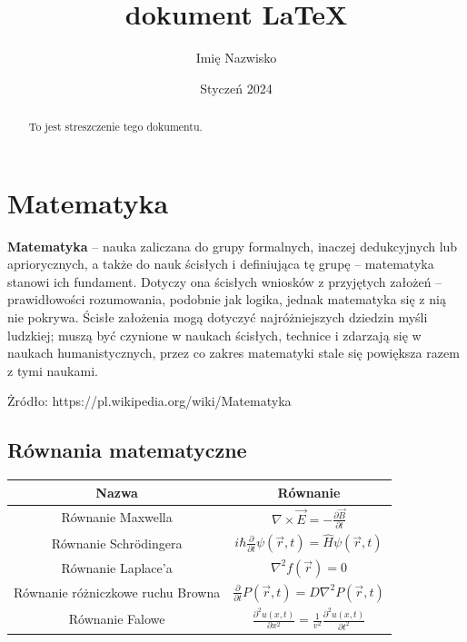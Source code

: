 \documentclass[]{article}
\title{dokument  \LaTeX}
\author{Imię Nazwisko}
\date{Styczeń 2024}
\begin{document}
\maketitle

\begin{abstract}
  To jest streszczenie tego dokumentu.
\end{abstract}

\tableofcontents

\newpage

\section{Matematyka}
\textbf{Matematyka } – nauka zaliczana do grupy formalnych, inaczej dedukcyjnych lub apriorycznych, a także do nauk ścisłych i definiująca tę grupę – matematyka stanowi ich fundament. Dotyczy ona ścisłych wniosków z przyjętych założeń – prawidłowości rozumowania, podobnie jak logika, jednak matematyka się z nią nie pokrywa. Ścisłe założenia mogą dotyczyć najróżniejszych dziedzin myśli ludzkiej; muszą być czynione w naukach ścisłych, technice i zdarzają się w naukach humanistycznych, przez co zakres matematyki stale się powiększa razem z tymi naukami. 
\begin{flushright}
\scriptsize
Żródło: https://pl.wikipedia.org/wiki/Matematyka
\end{flushright}


\subsection{Równania matematyczne}
    \begin{table}[h!]
    \centering
	\begin{tabular}{|c|c|}
	\hline
	Nazwa & Równanie \\
	\hline
	Równanie Maxwella & $\nabla \times \vec{E} = - \frac{\partial \vec{B}}{\partial t}$ \\
	\hline
	Równanie Schrödingera & $i\hbar\frac{\partial}{\partial t}\psi(\vec{r},t) = \hat{H}\psi(\vec{r},t)$ \\
	\hline
	Równanie Laplace'a & $\nabla^2 f(\vec{r}) = 0$ \\
	\hline
	Równanie różniczkowe ruchu Browna & $\frac{\partial}{\partial t}P(\vec{r},t) = D\nabla^2 P(\vec{r},t)$ \\
	\hline
	Równanie Falowe & $\frac{\partial^2 u(x,t)}{\partial x^2} = \frac{1}{v^2}\frac{\partial^2 u(x,t)}{\partial t^2}$ \\
	\hline
\end{tabular}
  \label{tab:tabela}
\end{table}
\newpage
\end{document}
